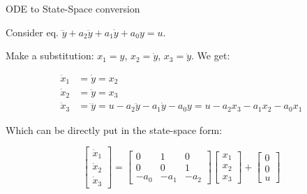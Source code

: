 \documentclass{beamer}
\begin{document}
\begin{frame}{ODE to State-Space conversion}
\begin{flushleft}

Consider eq. $\dddot{y} + a_2 \ddot{y} + a_1 \dot{y} + a_0 y =u$.

\bigskip

Make a substitution: $x_1 = y$, $x_2 = \dot{y}$, $x_3 = \ddot{y}$. We get:

\begin{align}
        \dot{x}_1 &= \dot{y} = x_2 \\
        \dot{x}_2 &= \ddot{y} = x_3 \\
        \dot{x}_3 &=  \dddot{y} = 
        u-a_2 \ddot{y} - a_1 \dot{y} - a_0 y = 
        u-a_2 x_3 - a_1 x_2 - a_0 x_1
\end{align}

Which can be directly put in the state-space form:

\begin{equation}
\begin{bmatrix}
\dot{x}_1 \\ \dot{x}_2 \\ \dot{x}_3
\end{bmatrix} 
=
\begin{bmatrix}
0 & 1 & 0 \\ 
0 & 0 & 1 \\
-a_0 & -a_1 & -a_2
\end{bmatrix} 
\begin{bmatrix}
x_1 \\ x_2 \\ x_3
\end{bmatrix} 
+ 
\begin{bmatrix}
0 \\ 0 \\ u
\end{bmatrix}
\end{equation}


\end{flushleft}
\end{frame}
\end{document}
